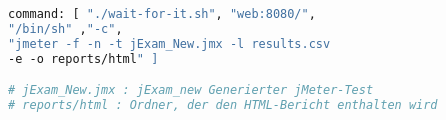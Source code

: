 \begin{lstlisting}[language=Dockerfile,label={lst:jmeter},caption={JMeter Ausführungsbefehl}]
    command: [ "./wait-for-it.sh", "web:8080/",
"/bin/sh" ,"-c",
"jmeter -f -n -t jExam_New.jmx -l results.csv
-e -o reports/html" ]

# jExam_New.jmx : jExam_new Generierter jMeter-Test
# reports/html : Ordner, der den HTML-Bericht enthalten wird
\end{lstlisting}
